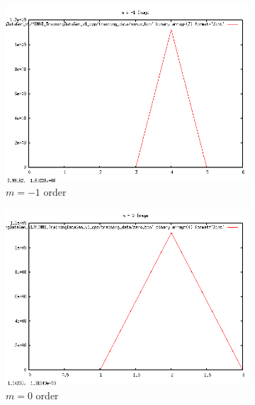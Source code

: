 \documentclass[twoside]{article}
\begin{document}
\begin{multicols}{2}
 \begin{figure}
     \centering
     \begin{subfigure}[b]{0.3\textwidth}
         \includegraphics[width=\textwidth]{images/m-1}
         \caption{$m = -1$ order }
     \end{subfigure}
      \begin{subfigure}[b]{0.3\textwidth}
          \includegraphics[width=\textwidth]{images/m0}
          \caption{$m = 0$ order }
      \end{subfigure}
        \begin{subfigure}[b]{0.3\textwidth}

\end{subfigure}
\end{figure}
\end{multicols}
\end{document}

